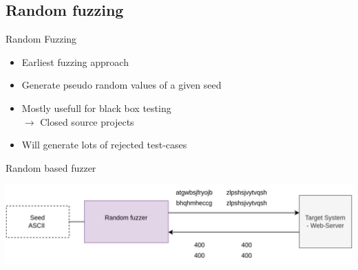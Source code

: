\documentclass{beamer}
\begin{document}
\subsection{Random fuzzing}
\begin{frame}{Random Fuzzing}
 \begin{itemize}
 \item Earliest fuzzing approach
  \item Generate pseudo random values of a given seed
  \item Mostly usefull for black box testing\\
  $\rightarrow$ Closed source projects
    \item Will generate lots of rejected test-cases

 \end{itemize}

\end{frame}
\begin{frame}{Random based fuzzer}
\begin{center}
 \includegraphics[scale=0.15]{basic2.png}
 \end{center}
 \end{frame}
\end{document}
